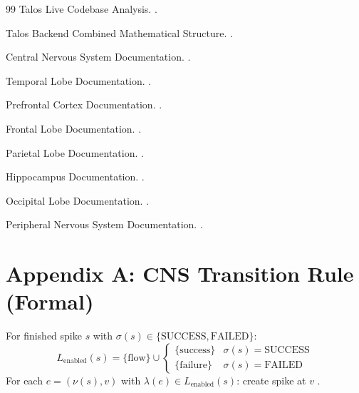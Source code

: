 \documentclass[11pt]{article}
\begin{document}
	\begin{thebibliography}{99}
		Talos Live Codebase Analysis. .

		Talos Backend Combined Mathematical Structure. .

		Central Nervous System Documentation. .

		Temporal Lobe Documentation. .

		Prefrontal Cortex Documentation. .

		Frontal Lobe Documentation. .

		Parietal Lobe Documentation. .

		Hippocampus Documentation. .

		Occipital Lobe Documentation. .

		Peripheral Nervous System Documentation. .
	\end{thebibliography}

	\appendix
	\section{Appendix A: CNS Transition Rule (Formal)}
	For finished spike $s$ with $\sigma(s) \in \{\text{SUCCESS}, \text{FAILED}\}$:
	$$
	L_{\text{enabled}}(s) = \{\text{flow}\} \cup \begin{cases}
	\{\text{success}\} & \sigma(s) = \text{SUCCESS} \\
	\{\text{failure}\} & \sigma(s) = \text{FAILED}
	\end{cases}
	$$
	For each $e = (\nu(s), v)$ with $\lambda(e) \in L_{\text{enabled}}(s)$: create spike at $v$ \cite{talosCNS,talosCombined}.
\end{document}
